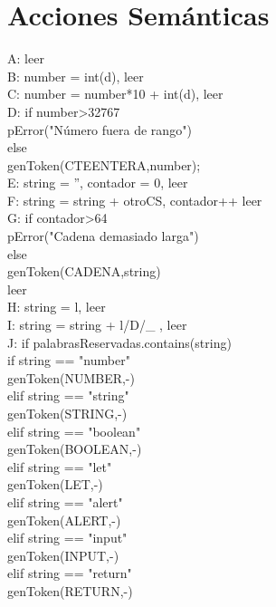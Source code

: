 \documentclass{article}
\begin{document}
\section{Acciones Semánticas}
\begin{flushleft}
A: leer\\
B: number = int(d), leer\\
C: number = number*10 + int(d), leer\\
D: if number>32767\\
       \qquad pError("Número fuera de rango")\\
   \quad else \\
        \qquad genToken(CTEENTERA,number);\\
E: string = '', contador = 0, leer\\
F: string = string + otroCS, contador++ leer\\
G: if contador>64\\
       \qquad pError("Cadena demasiado larga")\\
   \quad else\\
        \qquad genToken(CADENA,string)\\
  \quad leer\\
H: string = l, leer\\
I: string = string + l/D/\_ , leer\\
J: if palabrasReservadas.contains(string)\\
       \qquad if string == "number"\\
      \qquad \quad      genToken(NUMBER,-)\\
       \qquad elif string == "string"\\
       \qquad \quad     genToken(STRING,-)\\
      \qquad  elif string == "boolean"\\
      \qquad \quad      genToken(BOOLEAN,-)\\
    \qquad    elif string == "let"\\
      \qquad \quad      genToken(LET,-)\\
    \qquad    elif string == "alert"\\
      \qquad \quad      genToken(ALERT,-)\\
    \qquad    elif string == "input"\\
      \qquad \quad      genToken(INPUT,-)\\
    \qquad    elif string == "return"\\
     \qquad \quad       genToken(RETURN,-)\\

\end{flushleft}
\end{document}
